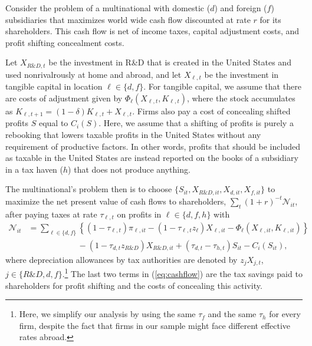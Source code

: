 \documentclass[11pt,letterpaper]{article}
\begin{document}
Consider the problem of a multinational with domestic ($d$)
and foreign ($f$) subsidiaries that maximizes world wide
cash flow discounted at rate $r$ for its shareholders.
This cash flow is net of income taxes, capital adjustment
costs, and profit shifting concealment costs.

Let $X_{\scriptstyle{R\&D},t}$ be the 
investment in R\&D that is created in the United States and
used nonrivalrously at home and abroad, and let
$X_{\ell,t}$ be the investment in tangible capital in location
$\ell\in\{d,f\}$. For tangible capital, we assume that there
are costs of adjustment given by
$\Phi_\ell(X_{\ell,t},K_{\ell,t})$, where the stock accumulates as
$K_{\ell,t+1}=(1-\delta)K_{\ell,t}+X_{\ell,t}$.
Firms also pay a cost of concealing shifted profits $S$ equal
to $C_i(S)$.
Here, we assume that a shifting of profits is purely a rebooking
that lowers taxable profits in the United States without
any requirement of productive factors. In other words,
profits that should be included as taxable in the United States
are instead reported on the books of a subsidiary in a tax haven ($h$)
that does not produce anything. 

The multinational's problem then is
to choose $\{S_{it},X_{{\scriptstyle R\&D},it},X_{d,it},X_{f,it}\}$
to maximize the net present value of cash flows
to shareholders, $\sum_t(1+r)^{-t}\mathcal{N}_{it}$, after paying
taxes at rate $\tau_{\ell,t}$ on profits in $\ell\in\{d,f,h\}$ with
\begin{align}
  \mathcal{N}_{it} & = \sum_{\ell\in\{d,f\}} \left\{(1-\tau_{\ell,t}) \pi_{\ell,it}-(1-\tau_{\ell,t} z_{\ell})X_{\ell,it} 
                         - \Phi_\ell(X_{\ell,it},K_{\ell,it})\right\}\nonumber \\
                &\qquad\qquad\qquad -  (1-\tau_{d,t} z_{{\scriptstyle R\&D}}) X_{{\scriptstyle R\&D},it} 
                          +(\tau_{d,t}-\tau_{h,t})S_{it} - C_i(S_{it}),
\label{eq:cashflow}
\end{align}
where depreciation allowances by tax authorities are denoted by
$z_jX_{j,t}$, $j\in\{{\scriptstyle R\&D},d,f\}$.\footnote{%
Here, we simplify our analysis by using the same $\tau_f$ and the
same $\tau_h$ for every firm, despite the fact that firms in our
sample might face different effective rates abroad.}
The last two terms in (\ref{eq:cashflow}) are the tax savings paid
to shareholders for profit shifting and the costs of concealing this
activity.
\end{document}
